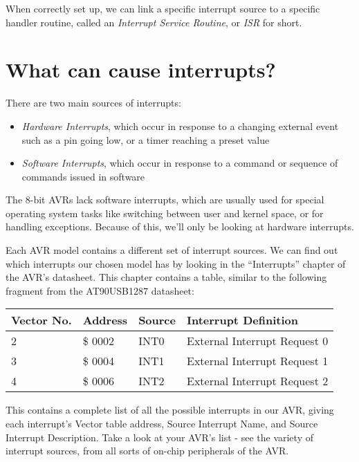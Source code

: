 \documentclass[a4paper,oneside,notitlepage]{book}
\begin{document}
When correctly set up, we can link a specific interrupt source to a specific handler routine, called an \textit{Interrupt Service Routine}, or \textit{ISR} for short.


\chapter{What can cause interrupts?}
\label{chp:InterruptCauses}

There are two main sources of interrupts:

\begin{itemize}
\item \textit{Hardware Interrupts}, which occur in response to a changing external event such as a pin going low, or a timer reaching a preset value
\item \textit{Software Interrupts}, which occur in response to a command or sequence of commands issued in software
\end{itemize}

The 8-bit AVRs lack software interrupts, which are usually used for special operating system tasks like switching between user and kernel space, or for handling exceptions. Because of this, we'll only be looking at hardware interrupts.

Each AVR model contains a different set of interrupt sources. We can find out which interrupts our chosen model has by looking in the ``Interrupts'' chapter of the AVR's datasheet. This chapter contains a table, similar to the following fragment from the AT90USB1287 datasheet:

\begin{center}
\begin{tabular}{|l|l|l|l|}
	\hline
	Vector No. & Address & Source & Interrupt Definition \\
	\hline
	2          & \$ 0002   & INT0   & External Interrupt Request 0 \\
	3          & \$ 0004   & INT1   & External Interrupt Request 1 \\
	4          & \$ 0006   & INT2   & External Interrupt Request 2 \\
	\hline
\end{tabular}
\end{center}

This contains a complete list of all the possible interrupts in our AVR, giving each interrupt's Vector table address, Source Interrupt Name, and Source Interrupt Description. Take a look at your AVR's list - see the variety of interrupt sources, from all sorts of on-chip peripherals of the AVR.
\end{document}
